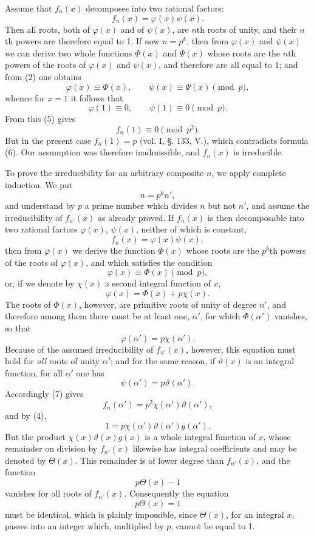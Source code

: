 \documentclass[11pt]{article}
\begin{document}
Assume that $f_n(x)$ decomposes into two rational factors:
\begin{equation}\tag{5}
f_n(x)=\varphi(x)\psi(x).
\end{equation}
Then all roots, both of $\varphi(x)$ and of $\psi(x)$, are $n$th roots of unity, and their $n$th powers are therefore equal to 1. If now $n=p^k$, then from $\varphi(x)$ and $\psi(x)$ we can derive two whole functions $\Phi(x)$ and $\Psi(x)$ whose roots are the $n$th powers of the roots of $\varphi(x)$ and $\psi(x)$, and therefore are all equal to 1; and from (2) one obtains
\[
\varphi(x)\equiv\Phi(x),\qquad \psi(x)\equiv\Psi(x) \pmod p,
\]
whence for $x=1$ it follows that
\[
\varphi(1)\equiv0,
\qquad
\psi(1)\equiv0 \pmod p.
\]
From this (5) gives
\begin{equation}\tag{6}
f_n(1)\equiv0 \pmod {p^2}.
\end{equation}
But in the present case $f_n(1)=p$ (vol. I, §. 133, V.), which contradicts formula (6). Our assumption was therefore inadmissible, and $f_n(x)$ is irreducible.

To prove the irreducibility for an arbitrary composite $n$, we apply complete induction. We put
\[
n=p^k n',
\]
and understand by $p$ a prime number which divides $n$ but not $n'$, and assume the irreducibility of $f_{n'}(x)$ as already proved. If $f_n(x)$ is then decomposable into two rational factors $\varphi(x)$, $\psi(x)$, neither of which is constant,
\begin{equation}\tag{7}
f_n(x)=\varphi(x)\psi(x),
\end{equation}
then from $\varphi(x)$ we derive the function $\Phi(x)$ whose roots are the $p^k$th powers of the roots of $\varphi(x)$, and which satisfies the condition
\[
\varphi(x)\equiv\Phi(x) \pmod p,
\]
or, if we denote by $\chi(x)$ a second integral function of $x$,
\[
\varphi(x)=\Phi(x)+p\chi(x).
\]
The roots of $\Phi(x)$, however, are primitive roots of unity of degree $n'$, and therefore among them there must be at least one, $\alpha'$, for which $\Phi(\alpha')$ vanishes, so that
\[
\varphi(\alpha')=p\chi(\alpha').
\]
Because of the assumed irreducibility of $f_{n'}(x)$, however, this equation must hold for \emph{all} roots of unity $\alpha'$; and for the same reason, if $\vartheta(x)$ is an integral function, for all $\alpha'$ one has
\[
\psi(\alpha')=p\vartheta(\alpha').
\]
Accordingly (7) gives
\[
f_n(\alpha')=p^2\chi(\alpha')\vartheta(\alpha'),
\]
and by (4),
\[
1=p\chi(\alpha')\vartheta(\alpha')g(\alpha').
\]
But the product $\chi(x)\vartheta(x)g(x)$ is a whole integral function of $x$, whose remainder on division by $f_{n'}(x)$ likewise has integral coefficients and may be denoted by $\Theta(x)$. This remainder is of lower degree than $f_{n'}(x)$, and the function
\[
p\Theta(x)-1
\]
vanishes for all roots of $f_{n'}(x)$. Consequently the equation
\[
p\Theta(x)=1
\]
must be identical, which is plainly impossible, since $\Theta(x)$, for an integral $x$, passes into an integer which, multiplied by $p$, cannot be equal to 1.
\end{document}
